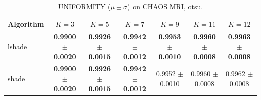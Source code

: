 \begin{table}[htbp]
\centering
\caption{UNIFORMITY ($\mu \pm \sigma$) on CHAOS MRI, otsu.}
\label{tab:exp2-otsu-uniformity}
\begin{tabular}{lcccccc}
\toprule
Algorithm & $K=3$ & $K=5$ & $K=7$ & $K=9$ & $K=11$ & $K=12$ \\
\midrule
lshade & \textbf{0.9900 $\pm$ 0.0020} & \textbf{0.9926 $\pm$ 0.0015} & \textbf{0.9942 $\pm$ 0.0012} & \textbf{0.9953 $\pm$ 0.0010} & \textbf{0.9960 $\pm$ 0.0008} & \textbf{0.9963 $\pm$ 0.0008} \\
shade & \textbf{0.9900 $\pm$ 0.0020} & \textbf{0.9926 $\pm$ 0.0015} & \textbf{0.9942 $\pm$ 0.0012} & 0.9952 $\pm$ 0.0010 & 0.9960 $\pm$ 0.0008 & 0.9962 $\pm$ 0.0008 \\
\bottomrule
\end{tabular}
\end{table}